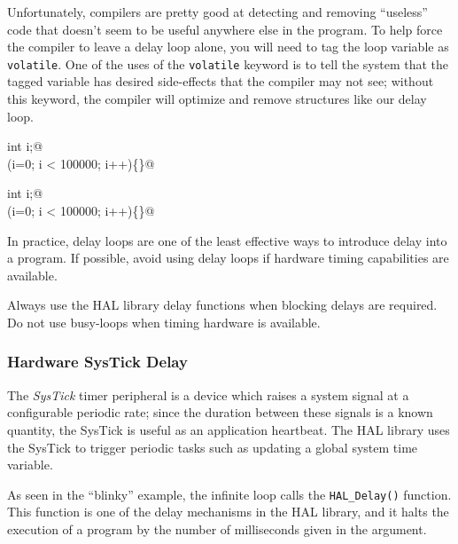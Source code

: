 \documentclass[openany,11pt,fleqn]{book} %
\begin{document}
Unfortunately, compilers are pretty good at detecting and removing ``useless'' code that doesn't seem to be useful anywhere else in the program. To help force the compiler to leave a delay loop alone, you will need to tag the loop variable as \texttt{volatile}. One of the uses of the \texttt{volatile} keyword is to tell the system that the tagged variable has desired side-effects that the compiler may not see; without this keyword, the compiler will optimize and remove structures like our delay loop.

\colorbox{gray!20!white}{
    \centering
    \begin{minipage}{\linewidth}
        \lstinline@volatile int i;@ \\
        \lstinline@for(i=0; i < 100000; i++)\{\}@ 
    \end{minipage}
}

\smallskip
\colorbox{gray!20!white}{
    \centering
    \parbox{\linewidth-2\fboxsep}{
        \lstinline@volatile int i;@ \\
        \lstinline@for(i=0; i < 100000; i++)\{\}@ 
    }
}
\smallskip

In practice, delay loops are one of the least effective ways to introduce delay into a program. If possible, avoid using delay loops if hardware timing capabilities are available. 

\begin{warning}
    Always use the HAL library delay functions when blocking delays are required. Do not use busy-loops when timing hardware is available.
\end{warning}

\subsubsection{Hardware SysTick Delay}

The \textit{SysTick} timer peripheral is a device which raises a system signal at a configurable periodic rate; since the duration between these signals is a known quantity, the SysTick is useful as an application heartbeat. The HAL library uses the SysTick to trigger periodic tasks such as updating a global system time variable. 

As seen in the ``blinky'' example, the infinite loop calls the \texttt{HAL\_Delay()} function. This function is one of the delay mechanisms in the HAL library, and it halts the execution of a program by the number of milliseconds given in the argument. 
\end{document}
